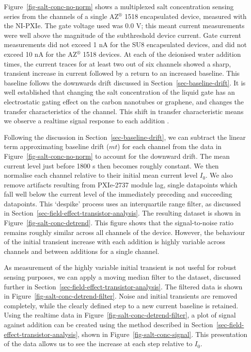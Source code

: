 \documentclass[
  a4paper,
]{scrbook}
\begin{document}
Figure~\ref{fig-salt-conc-no-norm} shows a multiplexed salt
concentration sensing series from the channels of a single
AZ\(^\circledR\) 1518 encapsulated device, measured with the NI-PXIe.
The gate voltage used was 0.0 V; this meant current measurements were
well above the magnitude of the subthreshold device current. Gate
current measurements did not exceed 1 nA for the SU8 encapsulated
devices, and did not exceed 10 nA for the AZ\(^\circledR\) 1518 devices.
At each of the deionised water addition times, the current traces for at
least two out of six channels showed a sharp, transient increase in
current followed by a return to an increased baseline. This baseline
follows the downwards drift discussed in
Section~\ref{sec-baseline-drift}. It is well established that changing
the salt concentration of the liquid gate has an electrostatic gating
effect on the carbon nanotubes or graphene, and changes the transfer
characteristics of the channel. This shift in transfer characteristic
means we observe a realtime signal response to each addition
\autocite{Heller2009,Heller2010,Kireev2017}.

Following the discussion in Section~\ref{sec-baseline-drift}, we can
subtract the linear term approximating baseline drift (\(mt\)) for each
channel from the data in Figure~\ref{fig-salt-conc-no-norm} to account
for the downward drift. The mean current level just before 1800 s then
becomes roughly constant. We then normalise each channel relative to
their initial mean current level \(I_{0}\). We also remove artifacts
resulting from PXIe-2737 module lag, single datapoints which fall well
below the current level of the immediately preceding and succeeding
datapoints. This `despike' process uses an interquartile range filter,
as discussed in Section~\ref{sec-field-effect-transistor-analysis}. The
resulting dataset is shown in Figure~\ref{fig-salt-conc-detrend}. This
figure shows that the signal-to-noise ratio remains roughly similar
across all channels of the device. However, the behaviour of the initial
transient increase with each addition is highly variable across channels
and between additions for a single channel.

As measurement of the highly variable initial transient is not useful
for robust sensing purposes, we can apply a moving median filter to the
dataset, discussed further in
Section~\ref{sec-field-effect-transistor-analysis}. The filtered data is
shown in Figure~\ref{fig-salt-conc-detrend-filter}. Noise and initial
transients are removed completely, while the clearly defined step to a
new current baseline is retained. Using the realtime data in
Figure~\ref{fig-salt-conc-detrend-filter}, a plot of signal against
addition can be created using the method described in
Section~\ref{sec-field-effect-transistor-analysis}, shown in
Figure~\ref{fig-salt-conc-signal}. This presentation of the data allows
us to see the increase at each step relative to \(I_{0}\).
\end{document}
